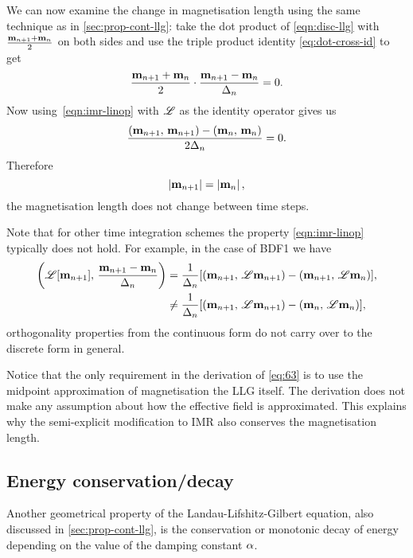 We can now examine the change in magnetisation length using the same technique as in \cref{sec:prop-cont-llg}: take the dot product of \cref{eqn:disc-llg} with $\frac{\mathbf{m}_{n+1} + \mathbf{m}_n}{2}$ on both sides and use the triple product identity \cref{eq:dot-cross-id} to get
\begin{equation}
  \label{eq:63}
  \frac{\mathbf{m}_{n+1} + \mathbf{m}_n}{2} \cdot \frac{\mathbf{m}_{n+1} - \mathbf{m}_n}{\Delta_{n}} = 0.
\end{equation}
Now using~\cref{eqn:imr-linop} with $\mathscr{L}$ as the identity operator gives us
\begin{equation}
  \frac{\left(\mathbf{m}_{n+1},\, \mathbf{m}_{n+1} \right) - \left(\mathbf{m}_n,\, \mathbf{m}_n \right) }{2 \Delta_{n}} = 0.
\end{equation}
Therefore
\begin{equation}
  \left|{\mathbf{m}_{n+1}} \right| = \left|{\mathbf{m}_n} \right|,
\end{equation}
\ie the magnetisation length does not change between time steps.

Note that for other time integration schemes the property \cref{eqn:imr-linop} typically does not hold.
For example, in the case of BDF1 we have
\begin{equation}
  \begin{aligned}
    \left(\mathscr{L} {\left[ \mathbf{m}_{n+1} \right]},\,  \frac{\mathbf{m}_{n+1} - \mathbf{m}_n}{\Delta_{n}}  \right)
    &= \frac{1}{\Delta_{n}} {\left[  \left(\mathbf{m}_{n+1},\, \mathscr{L} \mathbf{m}_{n+1} \right) 
      - \left(\mathbf{m}_{n+1},\, \mathscr{L} \mathbf{m}_n \right)  \right]}, \\
    &\neq \frac{1}{\Delta_{n}} {\left[  \left(\mathbf{m}_{n+1},\, \mathscr{L} \mathbf{m}_{n+1} \right)
      - \left(\mathbf{m}_n,\, \mathscr{L} \mathbf{m}_n \right)  \right]},
  \end{aligned}
\end{equation}
\ie orthogonality properties from the continuous form do not carry over to the discrete form in general.

Notice that the only requirement in the derivation of \cref{eq:63} is to use the midpoint approximation of magnetisation the LLG itself.
The derivation does not make any assumption about how the effective field is approximated.
This explains why the semi-explicit modification to IMR also conserves the magnetisation length. 


\subsection{Energy conservation/decay}
\label{sec:energy-cons}

Another geometrical property of the Landau-Lifshitz-Gilbert equation, also discussed in \cref{sec:prop-cont-llg}, is the conservation or monotonic decay of energy depending on the value of the damping constant $\alpha$.

